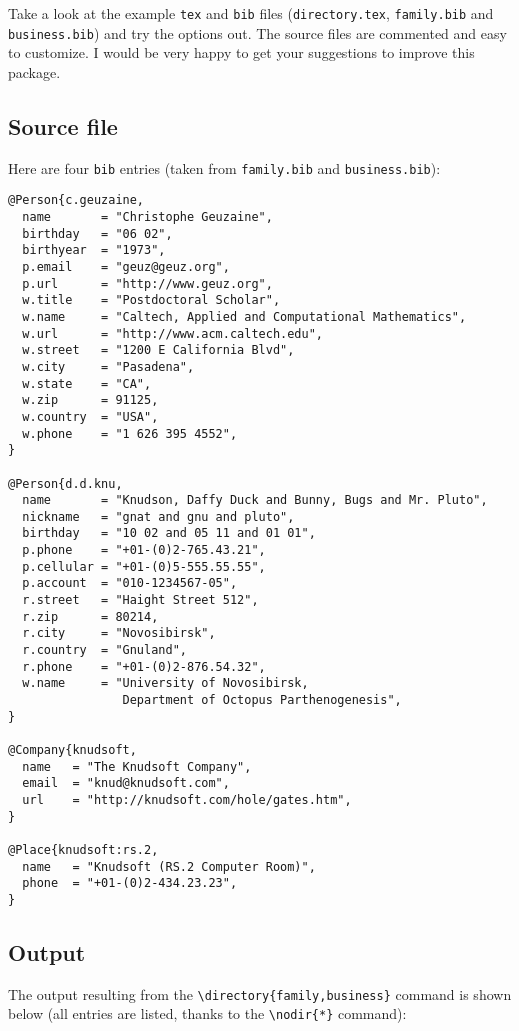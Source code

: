 \documentclass[10pt]{article}
\begin{document}
Take a look at the example \texttt{tex} and \texttt{bib}
files (\texttt{directory.tex}, \texttt{family.bib} and
\texttt{business.bib}) and try the options out. The source files are
commented and easy to customize. I would be very happy to get your suggestions
to improve this package. 

\subsection{Source file}

Here are four \texttt{bib} entries (taken from \texttt{family.bib} and 
\texttt{business.bib}):

\begin{verbatim}
@Person{c.geuzaine,
  name       = "Christophe Geuzaine",
  birthday   = "06 02",
  birthyear  = "1973",
  p.email    = "geuz@geuz.org",
  p.url      = "http://www.geuz.org",
  w.title    = "Postdoctoral Scholar",
  w.name     = "Caltech, Applied and Computational Mathematics",
  w.url      = "http://www.acm.caltech.edu",
  w.street   = "1200 E California Blvd",
  w.city     = "Pasadena",
  w.state    = "CA",
  w.zip      = 91125,
  w.country  = "USA",
  w.phone    = "1 626 395 4552",
}

@Person{d.d.knu,
  name       = "Knudson, Daffy Duck and Bunny, Bugs and Mr. Pluto",
  nickname   = "gnat and gnu and pluto",
  birthday   = "10 02 and 05 11 and 01 01",
  p.phone    = "+01-(0)2-765.43.21",
  p.cellular = "+01-(0)5-555.55.55",
  p.account  = "010-1234567-05",
  r.street   = "Haight Street 512",
  r.zip      = 80214,
  r.city     = "Novosibirsk",
  r.country  = "Gnuland",
  r.phone    = "+01-(0)2-876.54.32",
  w.name     = "University of Novosibirsk, 
                Department of Octopus Parthenogenesis",
}

@Company{knudsoft,
  name   = "The Knudsoft Company",
  email  = "knud@knudsoft.com", 
  url    = "http://knudsoft.com/hole/gates.htm", 
}

@Place{knudsoft:rs.2,
  name   = "Knudsoft (RS.2 Computer Room)",
  phone  = "+01-(0)2-434.23.23",
}
\end{verbatim}

\subsection{Output}
\label{sec:output}

The output resulting from the \verb'\directory{family,business}' command is 
shown below (all entries are listed, thanks to the \verb'\nodir{*}' command):
\end{document}
